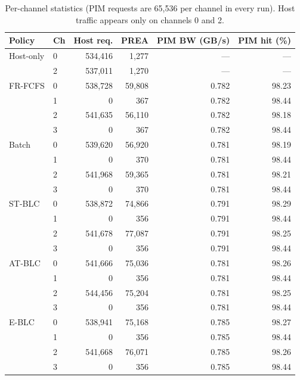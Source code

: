 \documentclass[conference]{IEEEtran}
\newcommand{\stblc}{ST-BLC}
\newcommand{\atblc}{AT-BLC}
\newcommand{\eblc}{E-BLC}
\begin{document}
\begin{table}[!tbp]
\centering
\caption{Per-channel statistics (PIM requests are 65{,}536 per channel in every run). Host traffic appears only on channels 0 and 2.}\label{tab:channel}
\scriptsize
\setlength{\tabcolsep}{3pt}
\begin{tabular}{@{}llrrrr@{}}
\toprule
\textbf{Policy} & \textbf{Ch} & \textbf{Host req.} & \textbf{PREA} & \textbf{PIM BW (GB/s)} & \textbf{PIM hit (\%)}\\
\midrule
Host-only & 0 & 534{,}416 & 1{,}277 & --- & ---\\
          & 2 & 537{,}011 & 1{,}270 & --- & ---\\
\midrule
FR-FCFS & 0 & 538{,}728 & 59{,}808 & 0.782 & 98.23\\
        & 1 & 0 & 367 & 0.782 & 98.44\\
        & 2 & 541{,}635 & 56{,}110 & 0.782 & 98.18\\
        & 3 & 0 & 367 & 0.782 & 98.44\\
\midrule
Batch   & 0 & 539{,}620 & 56{,}920 & 0.781 & 98.19\\
        & 1 & 0 & 370 & 0.781 & 98.44\\
        & 2 & 541{,}968 & 59{,}365 & 0.781 & 98.21\\
        & 3 & 0 & 370 & 0.781 & 98.44\\
\midrule
\stblc  & 0 & 538{,}872 & 74{,}866 & 0.791 & 98.29\\
        & 1 & 0 & 356 & 0.791 & 98.44\\
        & 2 & 541{,}678 & 77{,}087 & 0.791 & 98.25\\
        & 3 & 0 & 356 & 0.791 & 98.44\\
\midrule
\atblc  & 0 & 541{,}666 & 75{,}036 & 0.781 & 98.26\\
        & 1 & 0 & 356 & 0.781 & 98.44\\
        & 2 & 544{,}456 & 75{,}204 & 0.781 & 98.25\\
        & 3 & 0 & 356 & 0.781 & 98.44\\
\midrule
\eblc   & 0 & 538{,}941 & 75{,}168 & 0.785 & 98.27\\
        & 1 & 0 & 356 & 0.785 & 98.44\\
        & 2 & 541{,}668 & 76{,}071 & 0.785 & 98.26\\
        & 3 & 0 & 356 & 0.785 & 98.44\\
\bottomrule
\end{tabular}
\end{table}
\end{document}
